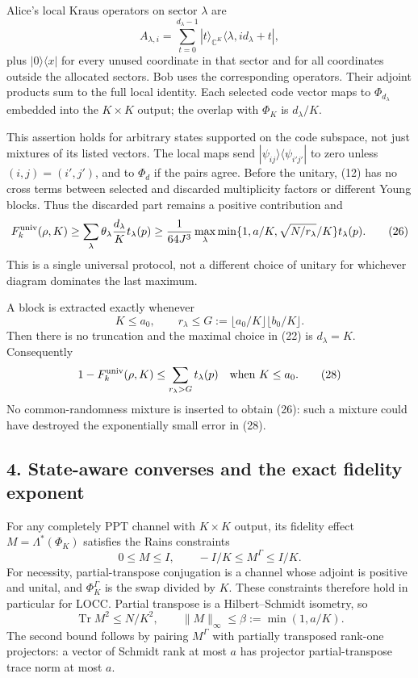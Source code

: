 \documentclass[11pt]{article}
\begin{document}
Alice's local Kraus operators on sector \(\lambda\) are \[
 A_{\lambda,i}=\sum_{t=0}^{d_\lambda-1}|t\rangle_{\mathbb C^K}
          \langle\lambda,id_\lambda+t|,
 \tag{25}
\] plus \(|0\rangle\langle x|\) for every unused coordinate in that sector and for all coordinates outside the allocated sectors. Bob uses the corresponding operators. Their adjoint products sum to the full local identity. Each selected code vector maps to \(\Phi_{d_\lambda}\) embedded into the \(K\times K\) output; the overlap with \(\Phi_K\) is \(d_\lambda/K\).

This assertion holds for arbitrary states supported on the code subspace, not just mixtures of its listed vectors. The local maps send \(|\psi_{ij}\rangle\langle\psi_{i'j'}|\) to zero unless \((i,j)=(i',j')\), and to \(\Phi_d\) if the pairs agree. Before the unitary, (12) has no cross terms between selected and discarded multiplicity factors or different Young blocks. Thus the discarded part remains a positive contribution and \[
 F_k^{\rm univ}(\rho,K)\ge
 \sum_\lambda\theta_\lambda\frac{d_\lambda}{K}t_\lambda(p)
 \ge\frac1{64J^3}\max_\lambda
   \min\{1,a/K,\sqrt{N/r_\lambda}/K\}t_\lambda(p).
 \tag{26}
\] This is a single universal protocol, not a different choice of unitary for whichever diagram dominates the last maximum.

A block is extracted exactly whenever \[
 K\le a_0,\qquad r_\lambda\le G:=\lfloor a_0/K\rfloor\lfloor b_0/K\rfloor.
 \tag{27}
\] Then there is no truncation and the maximal choice in (22) is \(d_\lambda=K\). Consequently \[
 1-F_k^{\rm univ}(\rho,K)\le\sum_{r_\lambda>G}t_\lambda(p)
 \quad\text{when }K\le a_0.
 \tag{28}
\] No common-randomness mixture is inserted to obtain (26): such a mixture could have destroyed the exponentially small error in (28).

\hypertarget{state-aware-converses-and-the-exact-fidelity-exponent}{%
\subsection{4. State-aware converses and the exact fidelity exponent}\label{state-aware-converses-and-the-exact-fidelity-exponent}}

For any completely PPT channel with \(K\times K\) output, its fidelity effect \(M=\Lambda^*(\Phi_K)\) satisfies the Rains constraints \[
 0\le M\le I,\qquad -I/K\le M^\Gamma\le I/K.
 \tag{29}
\] For necessity, partial-transpose conjugation is a channel whose adjoint is positive and unital, and \(\Phi_K^\Gamma\) is the swap divided by \(K\). These constraints therefore hold in particular for LOCC. Partial transpose is a Hilbert--Schmidt isometry, so \[
 \operatorname{Tr}M^2\le N/K^2,
 \qquad\|M\|_\infty\le\beta:=\min(1,a/K).
 \tag{30}
\] The second bound follows by pairing \(M^\Gamma\) with partially transposed rank-one projectors: a vector of Schmidt rank at most \(a\) has projector partial-transpose trace norm at most \(a\).
\end{document}
